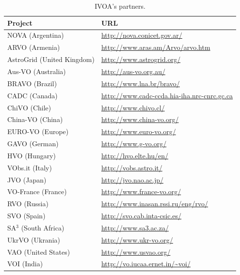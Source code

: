 \begin{table}%
\centering
\begin{tabular}{|l|l|}
	\hline
	\textbf{Project} & \textbf{URL} \\
	\hline
	NOVA (Argentina) & \url{http://nova.conicet.gov.ar/} \\
	\hline
	ARVO (Armenia) & \url{http://www.aras.am/Arvo/arvo.htm} \\
	\hline
	AstroGrid (United Kingdom) & \url{http://www.astrogrid.org/} \\
	\hline
	Aus-VO (Australia) & \url{http://aus-vo.org.au/} \\
	\hline
	BRAVO (Brazil) & \url{http://www.lna.br/bravo/} \\
	\hline
   CADC (Canada) &
    \url{http://www.cadc-ccda.hia-iha.nrc-cnrc.gc.ca} \\
	\hline
    ChiVO (Chile) & \url{http://www.chivo.cl/} \\
	\hline
    China-VO (China) &
    \url{http://www.china-vo.org/} \\
	\hline
	EURO-VO (Europe) & \url{http://www.euro-vo.org/} \\
	\hline
	GAVO (German) & \url{http://www.g-vo.org/} \\
	\hline
	HVO (Hungary) & \url{http://hvo.elte.hu/en/} \\
	\hline
	VObs.it (Italy) & \url{http://vobs.astro.it/} \\
	\hline
	JVO (Japan) & \url{http://jvo.nao.ac.jp/}\\
	\hline
	VO-France (France) & \url{http://www.france-vo.org/} \\
	\hline
	RVO (Russia) & \url{http://www.inasan.rssi.ru/eng/rvo/} \\
	\hline
	SVO (Spain) & \url{http://svo.cab.inta-csic.es/} \\
	\hline
	SA$^3$ (South Africa) & \url{http://www.sa3.ac.za/} \\
	\hline
	UkrVO (Ukrania) & \url{http://www.ukr-vo.org/} \\
	\hline
	VAO (United States) & \url{http://www.usvao.org/} \\
	\hline
	VOI (India) & \url{http://vo.iucaa.ernet.in/~voi/} \\
	\hline
\end{tabular}
\caption{IVOA's partners.}
\label{table:partners}
\end{table}

